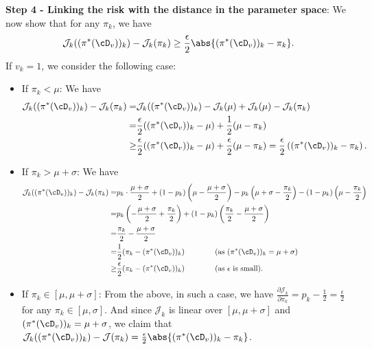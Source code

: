     \textbf{Step 4 - Linking the risk with the distance in the parameter space}: We now show that for any $\pi_k$, we have
    \[
        \mathcal J_k((\pi^*(\cD_v))_k) - \mathcal J_k(\pi_k) \geq \frac{\epsilon}{2}\abs{(\pi^*(\cD_v))_k - \pi_k}.
    \]
    If $v_k = 1$, we consider the following case:
    \begin{itemize}
        \item If $\pi_k < \mu$: We have
        \begin{equation*}
            \begin{aligned}
                \mathcal J_k((\pi^*(\cD_v))_k) - \mathcal J_k(\pi_k) 
                = & \mathcal J_k((\pi^*(\cD_v))_k) - \mathcal J_k(\mu) + \mathcal J_k(\mu) - \mathcal J_k(\pi_k) \\
                = &\frac{\epsilon}{2}((\pi^*(\cD_v))_k - \mu) + \frac{1}{2}(\mu - \pi_k) \\
                \geq &\frac{\epsilon}{2}((\pi^*(\cD_v))_k - \mu) + \frac{\epsilon}{2}(\mu - \pi_k) = \frac{\epsilon}{2}\left((\pi^*(\cD_v))_k - \pi_k\right).
            \end{aligned}
        \end{equation*}
        \item If $\pi_k > \mu + \sigma$: We have
        \begin{equation*}
            \begin{aligned}
                \mathcal J_k((\pi^*(\cD_v))_k) - \mathcal J_k(\pi_k)
                = &p_k\cdot \frac{\mu + \sigma}{2} + (1 - p_k)\left(\mu - \frac{\mu + \sigma}{2}\right) 
                - p_k\left(\mu + \sigma - \frac{\pi_k}{2}\right) - (1 - p_k)\left(\mu - \frac{\pi_k}{2}\right) \\
                = &p_k\left(- \frac{\mu + \sigma}{2} + \frac{\pi_k}{2}\right) + (1 - p_k) \left(\frac{\pi_k}{2} - \frac{\mu + \sigma}{2}\right) \\
                = &\frac{\pi_k}{2} - \frac{\mu + \sigma}{2} \\
                = &\frac{1}{2}(\pi_k - (\pi^*(\cD_v))_k) \qquad  \qquad
                 (\textup{as } (\pi^*(\cD_v))_k = \mu + \sigma) \\
                \geq &\frac{\epsilon}{2}(\pi_k - (\pi^*(\cD_v))_k) \qquad  \qquad (\textup{as $\epsilon$ is small}).
            \end{aligned}
        \end{equation*}
        \item If $\pi_k \in [\mu, \mu + \sigma]$: From the above, in such a case, we have $\frac{\partial \mathcal J_k}{\partial \pi_k} = p_k - \frac{1}{2} = \frac{\epsilon}{2}$ for any $\pi_k \in [\mu, \sigma]$. And since $\mathcal J_k$ is linear over $[\mu, \mu + \sigma]$ and $(\pi^*(\cD_v))_k = \mu + \sigma$, we claim that $\mathcal J_k((\pi^*(\cD_v))_k) - \mathcal J(\pi_k) = \frac{\epsilon}{2}\abs{(\pi^*(\cD_v))_k - \pi_k}$.
    \end{itemize}
